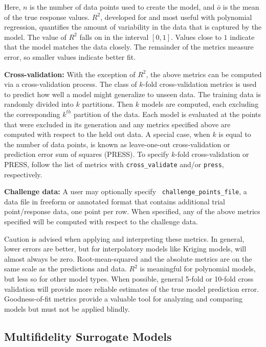 Here, $n$ is the number of data points used to create the model, and
$\bar{o}$ is the mean of the true response values.  $R^2$, developed
for and most useful with polynomial regression, quantifies the amount
of variability in the data that is captured by the model.  The value
of $R^2$ falls on in the interval $[0,1]$.  Values close to $1$
indicate that the model matches the data closely.  The remainder of
the metrics measure error, so smaller values indicate better fit.

{\bf Cross-validation:} With the exception of $R^2$, the above metrics
can be computed via a cross-validation process.  The class of $k$-fold
cross-validation metrics is used to predict how well a model might
generalize to unseen data.  The training data is randomly divided into
$k$ partitions.  Then $k$ models are computed, each excluding the
corresponding $k^{th}$ partition of the data.  Each model is evaluated
at the points that were excluded in its generation and any metrics
specified above are computed with respect to the held out data.  A
special case, when $k$ is equal to the number of data points, is known
as leave-one-out cross-validation or prediction error sum of squares
(PRESS).  To specify $k$-fold cross-validation or PRESS, follow the
list of metrics with {\tt cross\_validate} and/or {\tt press},
respectively.

{\bf Challenge data:} A user may optionally specify {\tt
  challenge\_points\_file}, a data file in freeform or annotated
format that contains additional trial point/response data, one point
per row.  When specified, any of the above metrics specified will be
computed with respect to the challenge data.

Caution is advised when applying and interpreting these metrics.  In
general, lower errors are better, but for interpolatory models like
Kriging models, will almost always be zero.  Root-mean-squared and the
absolute metrics are on the same scale as the predictions and data.
$R^2$ is meaningful for polynomial models, but less so for other model
types.  When possible, general 5-fold or 10-fold cross validation will
provide more reliable estimates of the true model prediction
error. Goodness-of-fit metrics provide a valuable tool for analyzing
and comparing models but must not be applied blindly.


\subsection{Multifidelity Surrogate Models} \label{models:surrogate:multifid}

